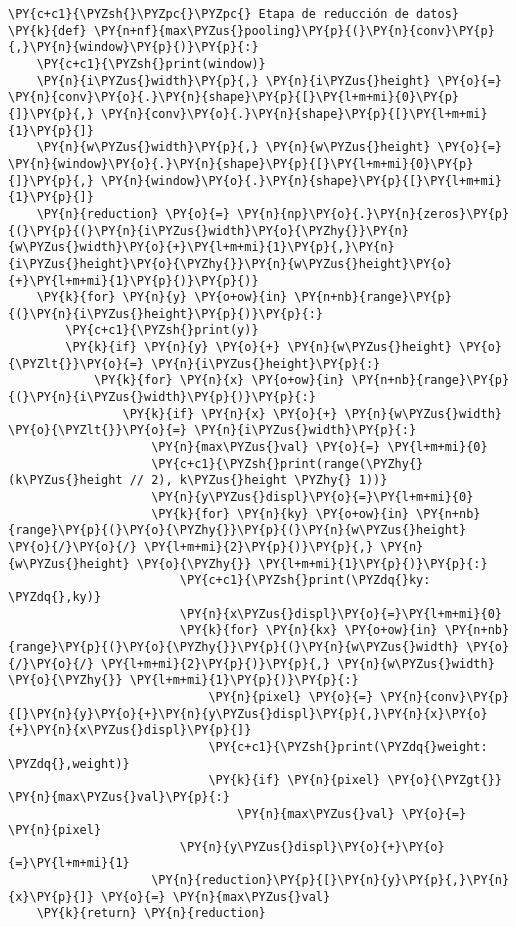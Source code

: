 \begin{tcolorbox}[breakable, size=fbox, boxrule=1pt, pad at break*=1mm,colback=cellbackground, colframe=cellborder]
\begin{Verbatim}[commandchars=\\\{\}]
\PY{c+c1}{\PYZsh{}\PYZpc{}\PYZpc{} Etapa de reducción de datos}
\PY{k}{def} \PY{n+nf}{max\PYZus{}pooling}\PY{p}{(}\PY{n}{conv}\PY{p}{,}\PY{n}{window}\PY{p}{)}\PY{p}{:}
    \PY{c+c1}{\PYZsh{}print(window)}
    \PY{n}{i\PYZus{}width}\PY{p}{,} \PY{n}{i\PYZus{}height} \PY{o}{=} \PY{n}{conv}\PY{o}{.}\PY{n}{shape}\PY{p}{[}\PY{l+m+mi}{0}\PY{p}{]}\PY{p}{,} \PY{n}{conv}\PY{o}{.}\PY{n}{shape}\PY{p}{[}\PY{l+m+mi}{1}\PY{p}{]}
    \PY{n}{w\PYZus{}width}\PY{p}{,} \PY{n}{w\PYZus{}height} \PY{o}{=} \PY{n}{window}\PY{o}{.}\PY{n}{shape}\PY{p}{[}\PY{l+m+mi}{0}\PY{p}{]}\PY{p}{,} \PY{n}{window}\PY{o}{.}\PY{n}{shape}\PY{p}{[}\PY{l+m+mi}{1}\PY{p}{]}
    \PY{n}{reduction} \PY{o}{=} \PY{n}{np}\PY{o}{.}\PY{n}{zeros}\PY{p}{(}\PY{p}{(}\PY{n}{i\PYZus{}width}\PY{o}{\PYZhy{}}\PY{n}{w\PYZus{}width}\PY{o}{+}\PY{l+m+mi}{1}\PY{p}{,}\PY{n}{i\PYZus{}height}\PY{o}{\PYZhy{}}\PY{n}{w\PYZus{}height}\PY{o}{+}\PY{l+m+mi}{1}\PY{p}{)}\PY{p}{)}
    \PY{k}{for} \PY{n}{y} \PY{o+ow}{in} \PY{n+nb}{range}\PY{p}{(}\PY{n}{i\PYZus{}height}\PY{p}{)}\PY{p}{:}
        \PY{c+c1}{\PYZsh{}print(y)}
        \PY{k}{if} \PY{n}{y} \PY{o}{+} \PY{n}{w\PYZus{}height} \PY{o}{\PYZlt{}}\PY{o}{=} \PY{n}{i\PYZus{}height}\PY{p}{:}
            \PY{k}{for} \PY{n}{x} \PY{o+ow}{in} \PY{n+nb}{range}\PY{p}{(}\PY{n}{i\PYZus{}width}\PY{p}{)}\PY{p}{:}
                \PY{k}{if} \PY{n}{x} \PY{o}{+} \PY{n}{w\PYZus{}width} \PY{o}{\PYZlt{}}\PY{o}{=} \PY{n}{i\PYZus{}width}\PY{p}{:}
                    \PY{n}{max\PYZus{}val} \PY{o}{=} \PY{l+m+mi}{0}
                    \PY{c+c1}{\PYZsh{}print(range(\PYZhy{}(k\PYZus{}height // 2), k\PYZus{}height \PYZhy{} 1))}
                    \PY{n}{y\PYZus{}displ}\PY{o}{=}\PY{l+m+mi}{0}
                    \PY{k}{for} \PY{n}{ky} \PY{o+ow}{in} \PY{n+nb}{range}\PY{p}{(}\PY{o}{\PYZhy{}}\PY{p}{(}\PY{n}{w\PYZus{}height} \PY{o}{/}\PY{o}{/} \PY{l+m+mi}{2}\PY{p}{)}\PY{p}{,} \PY{n}{w\PYZus{}height} \PY{o}{\PYZhy{}} \PY{l+m+mi}{1}\PY{p}{)}\PY{p}{:}
                        \PY{c+c1}{\PYZsh{}print(\PYZdq{}ky: \PYZdq{},ky)}
                        \PY{n}{x\PYZus{}displ}\PY{o}{=}\PY{l+m+mi}{0}
                        \PY{k}{for} \PY{n}{kx} \PY{o+ow}{in} \PY{n+nb}{range}\PY{p}{(}\PY{o}{\PYZhy{}}\PY{p}{(}\PY{n}{w\PYZus{}width} \PY{o}{/}\PY{o}{/} \PY{l+m+mi}{2}\PY{p}{)}\PY{p}{,} \PY{n}{w\PYZus{}width} \PY{o}{\PYZhy{}} \PY{l+m+mi}{1}\PY{p}{)}\PY{p}{:}
                            \PY{n}{pixel} \PY{o}{=} \PY{n}{conv}\PY{p}{[}\PY{n}{y}\PY{o}{+}\PY{n}{y\PYZus{}displ}\PY{p}{,}\PY{n}{x}\PY{o}{+}\PY{n}{x\PYZus{}displ}\PY{p}{]}
                            \PY{c+c1}{\PYZsh{}print(\PYZdq{}weight: \PYZdq{},weight)}
                            \PY{k}{if} \PY{n}{pixel} \PY{o}{\PYZgt{}} \PY{n}{max\PYZus{}val}\PY{p}{:}
                                \PY{n}{max\PYZus{}val} \PY{o}{=} \PY{n}{pixel}
                        \PY{n}{y\PYZus{}displ}\PY{o}{+}\PY{o}{=}\PY{l+m+mi}{1}
                    \PY{n}{reduction}\PY{p}{[}\PY{n}{y}\PY{p}{,}\PY{n}{x}\PY{p}{]} \PY{o}{=} \PY{n}{max\PYZus{}val}
    \PY{k}{return} \PY{n}{reduction}


\end{Verbatim}
\end{tcolorbox}
